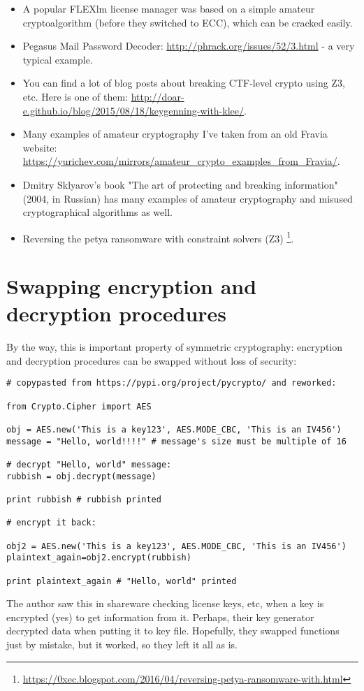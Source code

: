\begin{itemize}

\item A popular FLEXlm license manager was based on a simple amateur cryptoalgorithm
(before they switched to \ac{ECC}), which can be cracked easily.

\item Pegasus Mail Password Decoder: \url{http://phrack.org/issues/52/3.html} -
a very typical example.

\item You can find a lot of blog posts about breaking \ac{CTF}-level crypto using Z3, etc.
Here is one of them: \url{http://doar-e.github.io/blog/2015/08/18/keygenning-with-klee/}.

\item Many examples of amateur cryptography I've taken from an old Fravia website:
\url{https://yurichev.com/mirrors/amateur_crypto_examples_from_Fravia/}.

\item Dmitry Sklyarov's book "The art of protecting and breaking information" (2004, in Russian) has many examples of amateur cryptography and 
misused cryptographical algorithms as well.

\item Reversing the petya ransomware with constraint solvers (Z3)
\footnote{\url{https://0xec.blogspot.com/2016/04/reversing-petya-ransomware-with.html}}.

\end{itemize}




\section{Swapping encryption and decryption procedures}

By the way, this is important property of symmetric cryptography: encryption and decryption procedures can be swapped
without loss of security:

\begin{lstlisting}[style=custompy]
# copypasted from https://pypi.org/project/pycrypto/ and reworked:

from Crypto.Cipher import AES

obj = AES.new('This is a key123', AES.MODE_CBC, 'This is an IV456')
message = "Hello, world!!!!" # message's size must be multiple of 16

# decrypt "Hello, world" message:
rubbish = obj.decrypt(message)

print rubbish # rubbish printed

# encrypt it back:

obj2 = AES.new('This is a key123', AES.MODE_CBC, 'This is an IV456')
plaintext_again=obj2.encrypt(rubbish)

print plaintext_again # "Hello, world" printed
\end{lstlisting}

The author saw this in shareware checking license keys, etc, when a key is encrypted (yes) to get information from it.
Perhaps, their key generator decrypted data when putting it to key file.
Hopefully, they swapped functions just by mistake, but it worked, so they left it all as is.

